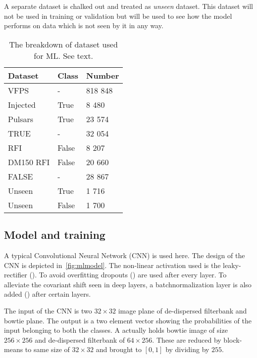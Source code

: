\par A separate dataset is chalked out and treated as \emph{unseen} dataset. This dataset will not be used in training or validation but will be used to see how the model performs on data which is not seen by it in any way.

\begin{table}[]
\label{tab:dataset}
	\begin{tabular}{@{}lll@{}}
		\toprule
		Dataset & Class & Number \\ \midrule
		VFPS & - & 818 848 \\ \midrule
		Injected & True & 8 480 \\
		Pulsars & True & 23 574 \\
		TRUE & - & 32 054 \\ \midrule
		RFI & False & 8 207 \\
		DM150 RFI & False & 20 660 \\ \midrule
		FALSE & - & 28 867 \\ \midrule
		Unseen & True & 1 716\\
		Unseen & False & 1 700\\ \bottomrule
	\end{tabular}
	\caption{The breakdown of \vfps dataset used for ML. See text.}
\end{table}

\subsection{Model and training}
\label{ssub:mlmodel}

\par A typical Convolutional Neural Network (CNN) is used here. The design of the CNN is depicted in~\autoref{fig:mlmodel}.
The non-linear activation used is the leaky-rectifier (\cite{lrelu}). To avoid overfitting dropouts (\cite{dropout,dropout2d}) are used after every layer.
To alleviate the covariant shift seen in deep layers, a batchnormalization layer is also added (\cite{batchnorm}) after certain layers.

\par The input of the CNN is two $32\times32$ image plane of de-dispersed filterbank and bowtie plane. 
The output is a two element vector showing the probabilities of the input belonging to both the classes.
A \dbson actually holds bowtie image of size $256\times256$ and de-dispersed filterbank of $64\times256$. 
These are reduced by block-means to same size of $32\times32$ and brought to $[0,1]$ by dividing by $255$.

